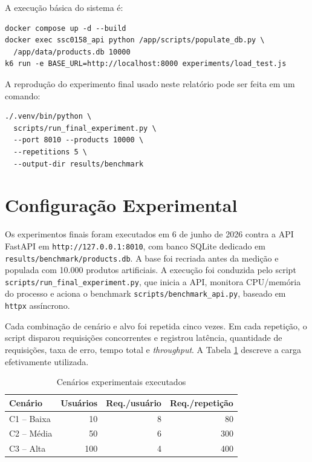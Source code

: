 \documentclass[journal]{IEEEtran}
\begin{document}
A execução básica do sistema é:

\begin{verbatim}
docker compose up -d --build
docker exec ssc0158_api python /app/scripts/populate_db.py \
  /app/data/products.db 10000
k6 run -e BASE_URL=http://localhost:8000 experiments/load_test.js
\end{verbatim}

A reprodução do experimento final usado neste relatório pode ser feita em um comando:

\begin{verbatim}
./.venv/bin/python \
  scripts/run_final_experiment.py \
  --port 8010 --products 10000 \
  --repetitions 5 \
  --output-dir results/benchmark
\end{verbatim}


\section{Configuração Experimental}

Os experimentos finais foram executados em 6 de junho de 2026 contra a API FastAPI em \texttt{http://127.0.0.1:8010}, com banco SQLite dedicado em \texttt{results/benchmark/products.db}. A base foi recriada antes da medição e populada com 10.000 produtos artificiais. A execução foi conduzida pelo script \texttt{scripts/run\_final\_experiment.py}, que inicia a API, monitora CPU/memória do processo e aciona o benchmark \texttt{scripts/benchmark\_api.py}, baseado em \texttt{httpx} assíncrono.

Cada combinação de cenário e alvo foi repetida cinco vezes. Em cada repetição, o script disparou requisições concorrentes e registrou latência, quantidade de requisições, taxa de erro, tempo total e \textit{throughput}. A Tabela \ref{tab:cenarios} descreve a carga efetivamente utilizada.

\begin{table}[htbp]
\caption{Cenários experimentais executados}
\label{tab:cenarios}
\centering
\renewcommand{\arraystretch}{1.2}
\begin{tabular}{lrrr}
\toprule
\textbf{Cenário} & \textbf{Usuários} & \textbf{Req./usuário} & \textbf{Req./repetição} \\
\midrule
C1 -- Baixa & 10 & 8 & 80 \\
C2 -- Média & 50 & 6 & 300 \\
C3 -- Alta & 100 & 4 & 400 \\
\bottomrule
\end{tabular}
\end{table}
\end{document}
